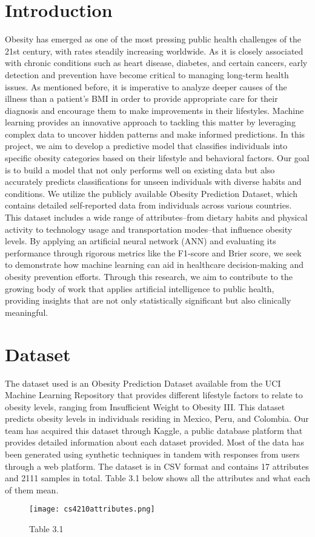 \documentclass[conference]{IEEEtran}
\begin{document}
\section{Introduction}
Obesity has emerged as one of the most pressing public health challenges of the 21st century, with rates steadily increasing worldwide. As it is closely associated with chronic conditions such as heart disease, diabetes, and certain cancers, early detection and prevention have become critical to managing long-term health issues. As mentioned before, it is imperative to analyze deeper causes of the illness than a patient’s BMI in order to provide appropriate care for their diagnosis and encourage them to make improvements in their lifestyles.
Machine learning provides an innovative approach to tackling this matter by leveraging complex data to uncover hidden patterns and make informed predictions. In this project, we aim to develop a predictive model that classifies individuals into specific obesity categories based on their lifestyle and behavioral factors. Our goal is to build a model that not only performs well on existing data but also accurately predicts classifications for unseen individuals with diverse habits and conditions. 
We utilize the publicly available Obesity Prediction Dataset, which contains detailed self-reported data from individuals across various countries. This dataset includes a wide range of attributes–from dietary habits and physical activity to technology usage and transportation modes–that influence obesity levels. By applying an artificial neural network (ANN) and evaluating its performance through rigorous metrics like the F1-score and Brier score, we seek to demonstrate how machine learning can aid in healthcare decision-making and obesity prevention efforts.
Through this research, we aim to contribute to the growing body of work that applies artificial intelligence to public health, providing insights that are not only statistically significant but also clinically meaningful.




\section{Dataset}



The dataset used is an Obesity Prediction Dataset available from the UCI Machine Learning Repository that provides different lifestyle factors to relate to obesity levels, ranging from Insufficient Weight to Obesity III. This dataset predicts obesity levels in individuals residing in Mexico, Peru, and Colombia. Our team has acquired this dataset through Kaggle, a public database platform that provides detailed information about each dataset provided. Most of the data has been generated using synthetic techniques in tandem with responses from users through a web platform. The dataset is in CSV format and contains 17 attributes and 2111 samples in total. Table 3.1 below shows all the attributes and what each of them mean.
\begin{figure}[htbp]
\centering
\texttt{[image: cs4210attributes.png]}
\caption{Table 3.1}
\label{Table 3.1}
\end{figure}
\end{document}
